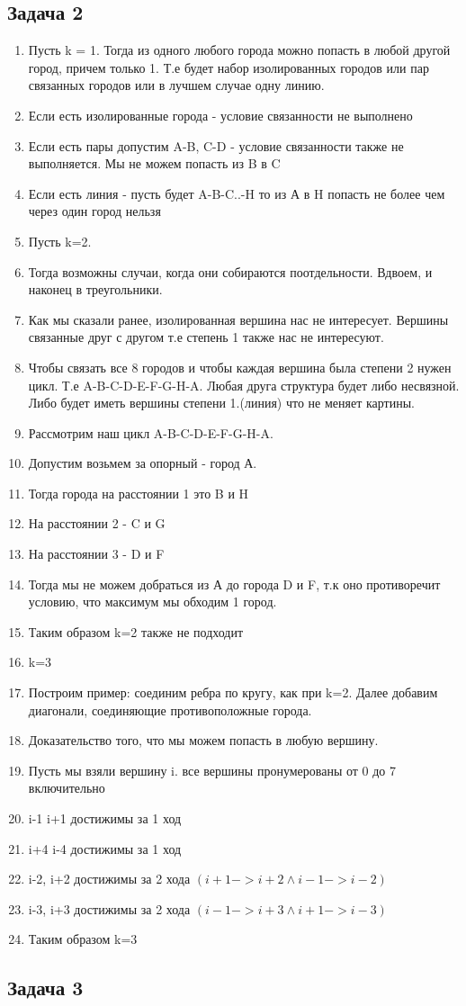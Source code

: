 \documentclass[a4paper,12pt]{article}
\begin{document}
\subsection{Задача 2}
\begin{enumerate}
    \item Пусть k = 1. Тогда из одного любого города можно попасть в любой другой город, причем только 1. Т.е будет набор изолированных городов или пар связанных городов  или в лучшем случае одну линию.
    \item Если есть изолированные города - условие связанности не выполнено
    \item Если есть пары допустим A-B, C-D - условие связанности также не выполняется. Мы не можем попасть из B в C
    \item Если есть линия - пусть будет A-B-C..-H то из А в H попасть не более чем через один город нельзя
    \item Пусть k=2. 
    \item Тогда возможны случаи, когда они собираются поотдельности. Вдвоем, и наконец в треугольники.
    \item Как мы сказали ранее, изолированная вершина нас не интересует. Вершины связанные друг с другом т.е степень 1 также нас не интересуют.
    \item Чтобы связать все 8 городов и чтобы каждая вершина была степени 2 нужен цикл. Т.е A-B-C-D-E-F-G-H-A. Любая друга структура будет либо несвязной. Либо будет иметь вершины степени 1.(линия) что не меняет картины.
    \item Рассмотрим наш цикл A-B-C-D-E-F-G-H-A.
    \item Допустим возьмем за опорный - город А.
    \item Тогда города на расстоянии 1 это B и H
    \item На расстоянии 2 - C и G
    \item На расстоянии 3 - D и F
    \item Тогда мы не можем добраться из А до города D и F, т.к оно противоречит условию, что максимум мы обходим 1 город.
    \item Таким образом k=2  также не подходит
    \item k=3
    \item Построим пример: соединим ребра по кругу, как при k=2. Далее добавим диагонали, соединяющие противоположные города.
    \item Доказательство того, что мы можем попасть в любую вершину.
    \item Пусть мы взяли вершину i. все вершины пронумерованы от 0 до 7 включительно
    \item i-1 i+1 достижимы за 1 ход
    \item i+4 i-4 достижимы за 1 ход
    \item i-2, i+2 достижимы за 2 хода $(i+1->i+2 \land i-1 -> i-2)$
    \item i-3, i+3 достижимы за 2 хода $(i-1 -> i+3 \land i+1 ->i-3)$
    \item Таким образом k=3
\end{enumerate}

\subsection{Задача 3}
\end{document}
